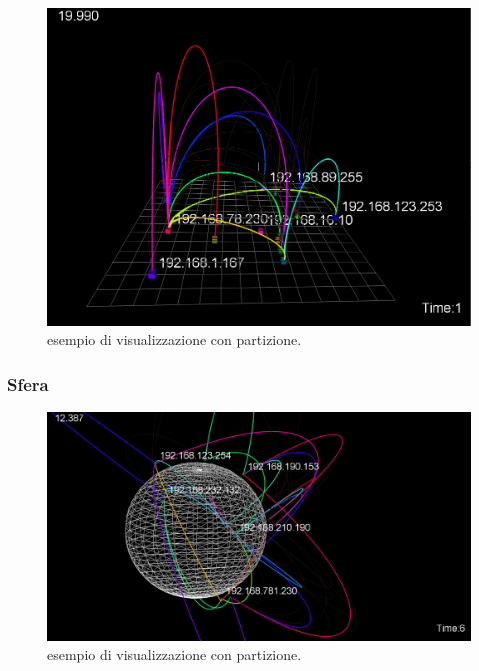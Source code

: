 \documentclass[a4paper,12pt]{article}
\begin{document}
\begin{figure}[htb!]
 \begin{center}
  \includegraphics[width=\textwidth]{images/image4.png}
 \end{center}
 \caption{esempio di visualizzazione con  partizione.}
 \label{fig:slider}
\end{figure}

\subsubsection{Sfera}

\begin{figure}[htb!]
 \begin{center}
  \includegraphics[width=\textwidth]{images/image5.png}
 \end{center}
 \caption{esempio di visualizzazione con  partizione.}
 \label{fig:slider}
\end{figure}
 
\end{document}
